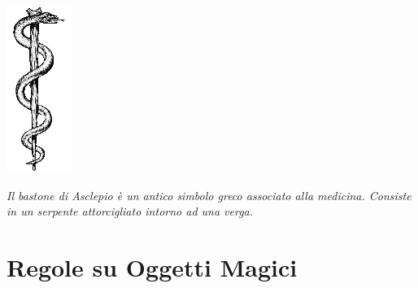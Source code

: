 \begin{center}
	\includegraphics[width=0.2\linewidth]{immagini/Rod_of_asclepius.png}

	\textit{Il bastone di Asclepio è un antico simbolo greco associato alla medicina. Consiste in un serpente attorcigliato intorno ad una verga.}
\end{center}


\pagebreak

\section{Regole su Oggetti Magici}\hypertarget{identificareom}{}

